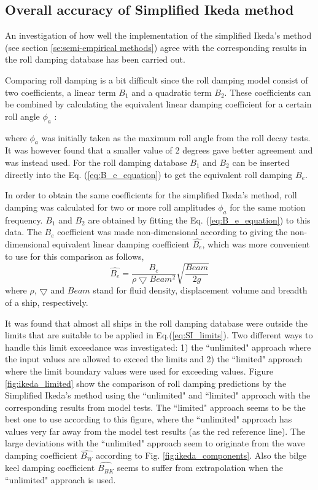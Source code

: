 \subsection{Overall accuracy of Simplified Ikeda method}
\label{se:overall_comparison}
An investigation of how well the implementation of the simplified Ikeda's method (see section \ref{se:semi-empirical methods}) agree with the corresponding results in the roll damping database has been carried out. 

Comparing roll damping is a bit difficult since the roll damping model consist of two coefficients, a linear term $B_1$ and a quadratic term $B_2$. These coefficients can be combined by calculating the equivalent linear damping coefficient for a certain roll angle $\phi_a$ \parencite{himeno_prediction_1981}:


where $\phi_a$ was initially taken as the maximum roll angle from the roll decay tests. It was however found that a smaller value of 2 degrees gave better agreement and was instead used. For the roll damping database $B_1$ and $B_2$ can be inserted directly into the Eq. (\ref{eq:B_e_equation}) to get the equivalent roll damping $B_e$.

In order to obtain the same coefficients for the simplified Ikeda's method, roll damping was calculated for two or more roll amplitudes $\phi_a$ for the same motion frequency. $B_1$ and $B_2$ are obtained by fitting the Eq. (\ref{eq:B_e_equation}) to this data. The $B_e$ coefficient was made non-dimensional according to \parencite{himeno_prediction_1981} giving the non-dimensional equivalent linear damping coefficient $\hat{B_e}$, which was more convenient to use for this comparison as follows,
\begin{equation} \label{eq:be_eqvalent}
    \hat{B_e} = \frac{B_e}{\rho \bigtriangledown Beam^2} \sqrt{\frac{Beam}{2g}}
\end{equation}
where $\rho$, $\bigtriangledown$ and $Beam$ stand for fluid density, displacement volume and breadth of a ship, respectively.

It was found that almost all ships in the roll damping database were outside the limits that are suitable to be applied in Eq.(\ref{eq:SI_limits}). Two different ways to handle this limit exceedance was investigated: 1) the ``unlimited" approach where the input values are allowed to exceed the limits and 2) the ``limited" approach where the limit boundary values were used for exceeding values. Figure \ref{fig:ikeda_limited} show the comparison of roll damping predictions by the Simplified Ikeda's method using the ``unlimited" and ``limited" approach with the corresponding results from model tests. The ``limited" approach seems to be the best one to use according to this figure, where the ``unlimited" approach has values very far away from the model test results (as the red reference line).   
The large deviations with the ``unlimited" approach seem to originate from the wave damping coefficient $\hat{B_W}$ according to Fig. \ref{fig:ikeda_components}. Also the bilge keel damping coefficient $\hat{B_{BK}}$ seems to suffer from extrapolation when the ``unlimited" approach is used. 

